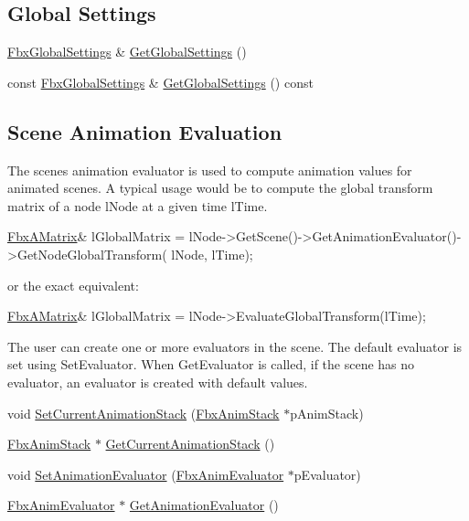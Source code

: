 \subsection*{Global Settings}
\begin{DoxyCompactItemize}
\item 
\hyperlink{class_fbx_global_settings}{Fbx\+Global\+Settings} \& \hyperlink{class_fbx_scene_a0cb767181a743532c9e9be17f0348570}{Get\+Global\+Settings} ()
\item 
const \hyperlink{class_fbx_global_settings}{Fbx\+Global\+Settings} \& \hyperlink{class_fbx_scene_a223ba0266f854f8243f9f6b2350a9404}{Get\+Global\+Settings} () const
\end{DoxyCompactItemize}
\subsection*{Scene Animation Evaluation}
\label{_amgrp75977921e44cb3c6a8bcac7b5f40eafc}%
 The scene\textquotesingle{}s animation evaluator is used to compute animation values for animated scenes. A typical usage would be to compute the global transform matrix of a node {\ttfamily l\+Node} at a given time {\ttfamily l\+Time}. 
\begin{DoxyCode}
\hyperlink{class_fbx_a_matrix}{FbxAMatrix}& lGlobalMatrix = lNode->GetScene()->GetAnimationEvaluator()->GetNodeGlobalTransform(
      lNode, lTime);

or the exact equivalent:

\hyperlink{class_fbx_a_matrix}{FbxAMatrix}& lGlobalMatrix = lNode->EvaluateGlobalTransform(lTime);
\end{DoxyCode}


The user can create one or more evaluators in the scene. The default evaluator is set using Set\+Evaluator. When Get\+Evaluator is called, if the scene has no evaluator, an evaluator is created with default values. \begin{DoxyCompactItemize}
\item 
void \hyperlink{class_fbx_scene_a19f5408a6460667dec584cd5363e3abe}{Set\+Current\+Animation\+Stack} (\hyperlink{class_fbx_anim_stack}{Fbx\+Anim\+Stack} $\ast$p\+Anim\+Stack)
\item 
\hyperlink{class_fbx_anim_stack}{Fbx\+Anim\+Stack} $\ast$ \hyperlink{class_fbx_scene_af8fde6643714a5e654e1e28d6f5470f9}{Get\+Current\+Animation\+Stack} ()
\item 
void \hyperlink{class_fbx_scene_a7fd2f5602c943f1050488e379fc18755}{Set\+Animation\+Evaluator} (\hyperlink{class_fbx_anim_evaluator}{Fbx\+Anim\+Evaluator} $\ast$p\+Evaluator)
\item 
\hyperlink{class_fbx_anim_evaluator}{Fbx\+Anim\+Evaluator} $\ast$ \hyperlink{class_fbx_scene_a6938500794b26f33a0a56a1ea4ce4a61}{Get\+Animation\+Evaluator} ()
\end{DoxyCompactItemize}
